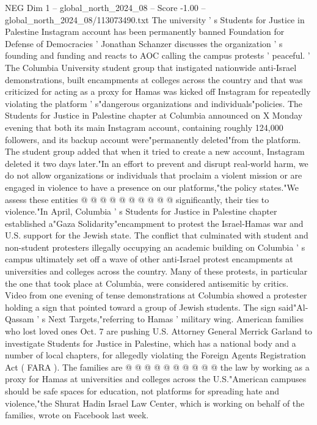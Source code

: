\begin{textsample}{NEG Dim 1 – global\_north\_2024\_08 – Score -1.00 – global\_north\_2024\_08/113073490.txt}  \label{ex:f1_neg_040}
The university ' s Students for Justice in Palestine Instagram account has been permanently banned Foundation for Defense of Democracies ' Jonathan Schanzer discusses the organization ' s founding and funding and reacts to AOC calling the campus protests ' peaceful. ' The Columbia University student group that instigated nationwide anti-Israel demonstrations, built encampments at colleges across the country and that was criticized for acting as a proxy for Hamas was kicked off Instagram for repeatedly violating the platform ' s"dangerous organizations and individuals"policies.
The Students for Justice in Palestine chapter at Columbia announced on X Monday evening that both its main Instagram account, containing roughly 124,000 followers, and its backup account were"permanently deleted"from the platform.
The student group added that when it tried to create a new account, Instagram deleted it two days later."In an effort to prevent and disrupt real-world harm, we do not allow organizations or individuals that proclaim a violent mission or are engaged in violence to have a presence on our platforms,"the policy states."We assess these entities @ @ @ @ @ @ @ @ @ @ significantly, their ties to violence."In April, Columbia ' s Students for Justice in Palestine chapter established a"Gaza Solidarity"encampment to protest the Israel-Hamas war and U.S. support for the Jewish state.
The conflict that culminated with student and non-student protesters illegally occupying an academic building on Columbia ' s campus ultimately set off a wave of other anti-Israel protest encampments at universities and colleges across the country.
Many of these protests, in particular the one that took place at Columbia, were considered antisemitic by critics.
Video from one evening of tense demonstrations at Columbia showed a protester holding a sign that pointed toward a group of Jewish students.
The sign said"Al-Qassam ' s Next Targets,"referring to Hamas ' military wing.
American families who lost loved ones Oct. 7 are pushing U.S.
Attorney General Merrick Garland to investigate Students for Justice in Palestine, which has a national body and a number of local chapters, for allegedly violating the Foreign Agents Registration Act ( FARA ).
The families are @ @ @ @ @ @ @ @ @ @ the law by working as a proxy for Hamas at universities and colleges across the U.S."American campuses should be safe spaces for education, not platforms for spreading hate and violence,"the Shurat Hadin Israel Law Center, which is working on behalf of the families, wrote on Facebook last week.

\end{textsample}

